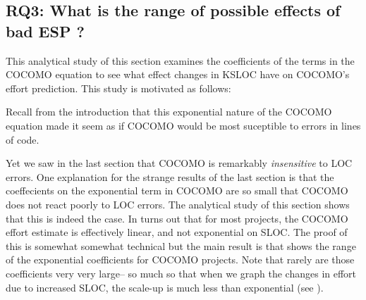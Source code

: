 \subsection{RQ3: What is the range of possible effects of bad ESP ?}\label{sect:rq3}
 This analytical study  of this section  examines the coefficients of the terms in the COCOMO equation
 to see what effect changes in KSLOC have on COCOMO's effort prediction.
 This study is motivated as follows:
 \bi
 \item
 Recall
from the introduction that this exponential nature of the COCOMO equation 
made it seem as if COCOMO would be most suceptible to errors in lines of code.
\item
Yet we saw in the last section that COCOMO is remarkably {\em insensitive} to LOC errors.
\ei
One explanation for the strange results of the last section is that the coeffecients
on the exponential term in   COCOMO   are so small that COCOMO does not
react poorly to LOC errors.
The analytical study of this section shows that this is indeed the case. In turns
out that for most projects, the COCOMO effort estimate is effectively linear, and not exponential
on SLOC.
The proof of this is somewhat somewhat technical but the main result is  
that shows the range  of the exponential coefficients for  COCOMO projects. Note that rarely are those coefficients very very large-- so much so that when we graph the changes in effort due to increased SLOC, the scale-up
is much less than exponential (see ).




